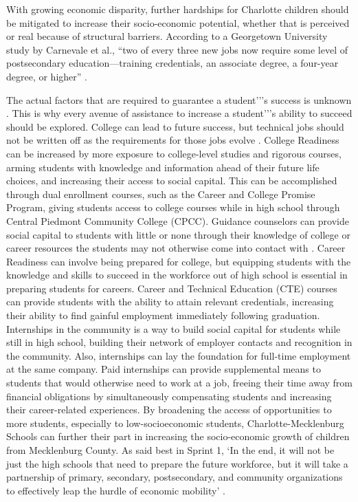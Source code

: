 With growing economic disparity, further hardships for Charlotte children should be mitigated to increase their socio-economic potential, whether that is perceived or real because of structural barriers. According to a Georgetown University study by Carnevale et al., “two of every three new jobs now require some level of postsecondary education—training credentials, an associate degree, a four-year degree, or higher” \parencite[as cited in][p. 26]{LOO}.

The actual factors that are required to guarantee a student'’'s success is unknown \parencite[][p. 27]{LOO}. 
This is why every avenue of assistance to increase a student'’'s ability to succeed should be explored. 
College can lead to future success, but technical jobs should not be written off as the requirements for those jobs evolve \parencite[][p. 27]{LOO}. 
College Readiness can be increased by more exposure to college-level studies and rigorous courses, arming students with knowledge and information ahead of their future life choices, and increasing their access to social capital. 
This can be accomplished through dual enrollment courses, such as the Career and College Promise Program, giving students access to college courses while in high school through Central Piedmont Community College (CPCC).
Guidance counselors can provide social capital to students with little or none  through their knowledge of college or career resources the students may not otherwise come into contact with \parencite{tang2019high}.
Career Readiness can involve being prepared for college, but equipping students with the knowledge and skills to succeed in the workforce out of high school is essential in preparing students for careers. 
Career and Technical Education (CTE) courses can provide students with the ability to attain relevant credentials, increasing their ability to find gainful employment immediately following graduation. Internships in the community is a way to build social capital for students while still in high school, building their network of employer contacts and recognition in the community. Also, internships can lay the foundation for full-time employment at the same company. 
Paid internships can provide supplemental means to students that would otherwise need to work at a job, freeing their time away from financial obligations by simultaneously compensating students and increasing their career-related experiences. 
By broadening the access of opportunities to more students, especially to low-socioeconomic students, Charlotte-Mecklenburg Schools can further their part in increasing the socio-economic growth of children from Mecklenburg County. 
As said best in Sprint 1, `In the end, it will not be just the high schools that need to prepare the future workforce, but it will take a partnership of primary, secondary, postsecondary, and community organizations to effectively leap the hurdle of economic mobility' \parencite[][p. 2]{sprint1}.
